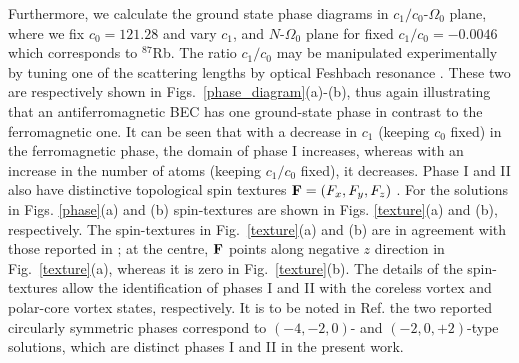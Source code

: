 \documentclass[pra,twocolumn,aps,superscriptaddress,showpacs,longbibliography]{revtex4-1}
\begin{document}
Furthermore, we calculate the ground state phase diagrams in
$c_1/c_0$-$\Omega_0$ plane, where we fix $c_0 = 121.28$ and vary $c_1$,
and $N$-$\Omega_0$ plane for fixed $c_1/c_0 = -0.0046$ which corresponds to $^{87}$Rb. 
The ratio $c_1/c_0$ may be manipulated experimentally by tuning one
of the scattering lengths by optical Feshbach resonance \cite{theis2004tuning}. These two
are respectively shown in Figs.~\ref{phase_diagram}(a)-(b), thus again illustrating
that an antiferromagnetic BEC has one ground-state phase in contrast to the ferromagnetic one. 
It can be seen that with a decrease in $c_1$ (keeping $c_0$ fixed) in the ferromagnetic phase, 
the domain of phase I increases, whereas with an increase in the number of atoms 
(keeping $c_1/c_0$ fixed), it decreases. 
Phase I and II also have distinctive topological spin textures {\color{black}  ${\bf F} = (F_x, F_y, F_z)$ }. For the solutions in Figs. \ref{phase}(a) and (b) 
spin-textures are shown in Figs. \ref{texture}(a) and (b), respectively. %
 The spin-textures in Fig.~\ref{texture}(a) and (b) are in agreement with those
reported in \cite{chen2018rotating}; at the centre, ${\bf F}$ points along negative $z$ direction in Fig.~\ref{texture}(a), whereas it is zero in Fig.~\ref{texture}(b).
The details of the spin-textures allow the identification of phases I and II with the coreless vortex and polar-core vortex states, respectively. 
It is to be noted in Ref. \cite{chen2016spin} the two reported circularly symmetric phases correspond to 
$(-4,-2,0)$- and $(-2,0,+2)$-type solutions, which are distinct phases I and II in the present work.
\end{document}
